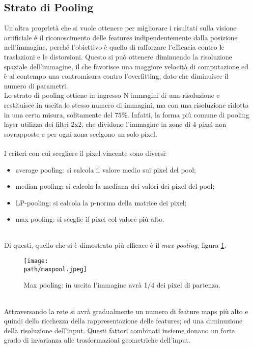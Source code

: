 \subsection{Strato di Pooling}
\label{subsec:pooling}
Un'altra proprietà che si vuole ottenere per migliorare i risultati sulla visione artificiale è il riconoscimento delle features indipendentemente dalla posizione nell'immagine, perché
l'obiettivo è quello di rafforzare l'efficacia contro le
traslazioni e le distorsioni. Questo si può ottenere diminuendo la risoluzione spaziale dell'immagine, il che favorisce una maggiore velocità di computazione ed è al contempo una contromisura contro l'overfitting, dato che diminuisce il numero di parametri.\\ 
Lo strato di pooling ottiene in ingresso N immagini di una risoluzione e restituisce in uscita lo stesso numero di immagini, ma con una risoluzione ridotta in una certa misura, solitamente del $75\%$. Infatti, la forma più comune di pooling layer utilizza dei filtri 2x2, che dividono l'immagine in zone di 4 pixel non sovrapposte e per ogni zona scelgono un solo pixel. \\
\\
I criteri con cui scegliere il pixel vincente sono diversi:
\begin{itemize}
\item average pooling: si calcola il valore medio sui pixel del pool;
\item median pooling: si calcola la mediana dei valori dei pixel del pool;
\item LP-pooling: si calcola la p-norma della matrice dei pixel;
\item max pooling: si sceglie il pixel col valore più alto.
\end{itemize}
\\
Di questi, quello che si è dimostrato più efficace è il \emph{max pooling}, figura \ref{fig:maxpool}.
\begin{figure}[h!]
 \centering
 \texttt{[image: \\path/maxpool.jpeg]} 
 \caption{Max pooling: in uscita l'immagine avrà 1/4 dei pixel di partenza.}
 \label{fig:maxpool}
\end{figure}
\\
Attraversando la rete si avrà gradualmente un numero di feature maps  più alto e quindi della ricchezza della rappresentazione delle features; ed una diminuzione della risoluzione dell'input. Questi fattori combinati insieme donano un forte grado di invarianza alle trasformazioni geometriche dell'input.
 
